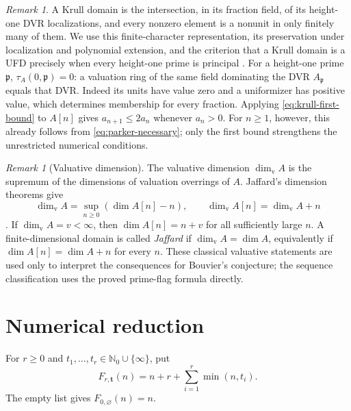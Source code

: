 \documentclass[11pt,reqno]{amsart}
\numberwithin{equation}{section}
\theoremstyle{plain}
\theoremstyle{definition}
\theoremstyle{remark}
\newtheorem{remark}[theorem]{Remark}
\begin{document}
\begin{remark}\label{rem:krull-preliminaries}
A Krull domain is the intersection, in its fraction field, of its
height-one DVR localizations, and every nonzero element is a nonunit
in only finitely many of them. We use this finite-character
representation, its preservation under localization and polynomial
extension, and the criterion that a Krull domain is a UFD precisely
when every height-one prime is principal \cite{Gilmer1972}.
For a height-one prime \(\mathfrak p\),
\(\tau_A(0,\mathfrak p)=0\): a valuation ring of the same field
dominating the DVR \(A_{\mathfrak p}\) equals that DVR. Indeed its
units have value zero and a uniformizer has positive value, which
determines membership for every fraction.
Applying \eqref{eq:krull-first-bound} to \(A[n]\) gives
\(a_{n+1}\leq2a_n\) whenever \(a_n>0\). For \(n\geq1\), however,
this already follows from \eqref{eq:parker-necessary}; only the first
bound strengthens the unrestricted numerical conditions.
\end{remark}

\begin{remark}[Valuative dimension]\label{rem:jaffard}
The valuative dimension \(\dim_{\mathrm v}A\) is the supremum of
the dimensions of valuation overrings of \(A\). Jaffard's dimension
theorems give
\[
 \dim_{\mathrm v}A=\sup_{n\geq0}(\dim A[n]-n),\qquad
 \dim_{\mathrm v}A[n]=\dim_{\mathrm v}A+n
\]
\cite[Ch.~IV, Theorems~2, 4, and~5]{Jaffard1960}.
If \(\dim_{\mathrm v}A=v<\infty\), then
\(\dim A[n]=n+v\) for all sufficiently large \(n\). A
finite-dimensional domain is called \emph{Jaffard} if
\(\dim_{\mathrm v}A=\dim A\), equivalently if
\(\dim A[n]=\dim A+n\) for every \(n\). These classical valuative
statements are used only to interpret the consequences for Bouvier's
conjecture; the sequence classification uses the proved prime-flag
formula directly.
\end{remark}

\section{Numerical reduction}
\label{sec:numerical}

For \(r\ge0\) and \(t_1,\ldots,t_r\in\mathbb N_0\cup\{\infty\}\), put
\begin{equation}\label{eq:basic-unrestricted}
 F_{r,\mathbf t}(n)=n+r+\sum_{i=1}^r\min(n,t_i).
\end{equation}
The empty list gives \(F_{0,\varnothing}(n)=n\).
\end{document}
